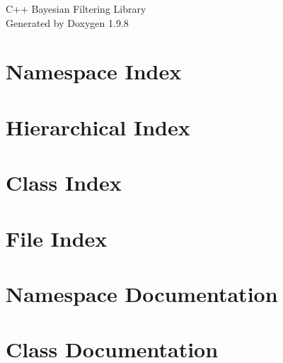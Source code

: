 \documentclass[twoside]{book}
\newcommand{\+}{\discretionary{\mbox{\scriptsize$\hookleftarrow$}}{}{}}
\newcommand{\clearemptydoublepage}{%
    \newpage{\pagestyle{empty}\cleardoublepage}%
  }
\begin{document}
  \raggedbottom
    \hypersetup{pageanchor=false,
                bookmarksnumbered=true,
                pdfencoding=unicode
               }
  \begin{titlepage}
  \vspace*{7cm}
  \begin{center}%
  {\Large C++ Bayesian Filtering Library}\\
  \vspace*{1cm}
  {\large Generated by Doxygen 1.9.8}\\
  \end{center}
  \end{titlepage}
  \clearemptydoublepage
  \tableofcontents
  \clearemptydoublepage
  \hypersetup{pageanchor=true}

\chapter{Namespace Index}

\chapter{Hierarchical Index}

\chapter{Class Index}

\chapter{File Index}

\chapter{Namespace Documentation}

\chapter{Class Documentation}











\end{document}
